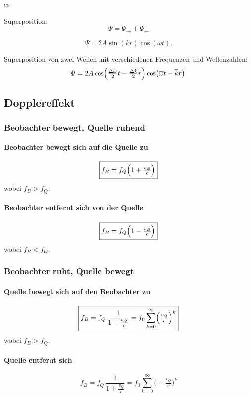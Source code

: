 es\documentclass[a4paper, fontsize=8pt, landscape]{scrartcl}
\begin{document}
\begin{multicols*}{4}
    Superposition:
    \[\Psi = \Psi_{\rightarrow} + \Psi_{\leftarrow}\]

    \[\Psi = 2A \sin(k r) \cos(\omega t).\]

    Superposition von zwei Wellen mit verschiedenen Frequenzen und Wellenzahlen:
    \[\Psi = 2A \cos\Bigl(\tfrac{\Delta \omega}{2}t - \tfrac{\Delta k}{2} r\Bigr) \cos\bigl(\overline{\omega}t - \overline{k} r\bigr).\]


\subsection{Dopplereffekt}
\subsubsection{Beobachter bewegt, Quelle ruhend}
\paragraph{Beobachter bewegt sich auf die Quelle zu}
\[\boxed{f_B =f_Q \Bigl(1 + \tfrac{v_B}{c}\Bigr)}\]
wobei \(f_B > f_Q\).\\

\paragraph{Beobachter entfernt sich von der Quelle}
\[\boxed{f_B = f_Q \Bigl(1 - \tfrac{v_B}{c}\Bigr)}\]
wobei \(f_B < f_Q\).\\

\subsubsection{Beobachter ruht, Quelle bewegt}
\paragraph{Quelle bewegt sich auf den Beobachter zu}
\[\boxed{f_B = f_Q \,\frac{1}{1 - \tfrac{v_Q}{c}} = f_0 \sum_{k=0}^{\infty} \Bigl(\tfrac{v_Q}{c}\Bigr)^k}\]
wobei \(f_B > f_Q\).\\

\paragraph{Quelle entfernt sich}
\[\boxed{f_B = f_Q \,\frac{1}{1 + \tfrac{v_Q}{c}} = f_0 \sum_{k=0}^{\infty} \bigl(-\tfrac{v_Q}{c}\bigr)^k}\]


\end{multicols*}
\end{document}
